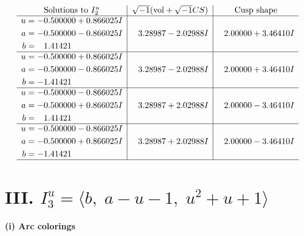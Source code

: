 \documentclass[1p]{elsarticle_modified}
\theoremstyle{definition}
\newcommand{\I}{\sqrt{-1}}
\begin{document}
$$\begin{array}{c|c|c}  
\text{Solutions to }I^u_{2}& \I (\text{vol} + \sqrt{-1}CS) & \text{Cusp shape}\\
 \hline 
\begin{aligned}
u &= -0.500000 + 0.866025 I \\
a &= -0.500000 - 0.866025 I \\
b &= \phantom{-}1.41421\phantom{ +0.000000I}\end{aligned}
 & \phantom{-}3.28987 - 2.02988 I & \phantom{-}2.00000 + 3.46410 I \\ \hline\begin{aligned}
u &= -0.500000 + 0.866025 I \\
a &= -0.500000 - 0.866025 I \\
b &= -1.41421\phantom{ +0.000000I}\end{aligned}
 & \phantom{-}3.28987 - 2.02988 I & \phantom{-}2.00000 + 3.46410 I \\ \hline\begin{aligned}
u &= -0.500000 - 0.866025 I \\
a &= -0.500000 + 0.866025 I \\
b &= \phantom{-}1.41421\phantom{ +0.000000I}\end{aligned}
 & \phantom{-}3.28987 + 2.02988 I & \phantom{-}2.00000 - 3.46410 I \\ \hline\begin{aligned}
u &= -0.500000 - 0.866025 I \\
a &= -0.500000 + 0.866025 I \\
b &= -1.41421\phantom{ +0.000000I}\end{aligned}
 & \phantom{-}3.28987 + 2.02988 I & \phantom{-}2.00000 - 3.46410 I\\
 \hline 
 \end{array}$$\newpage\newpage\renewcommand{\arraystretch}{1}
\centering \section*{III. $I^u_{3}= \langle b,\;a- u-1,\;u^2+u+1 \rangle$}
\flushleft \textbf{(i) Arc colorings}\\
\end{document}
